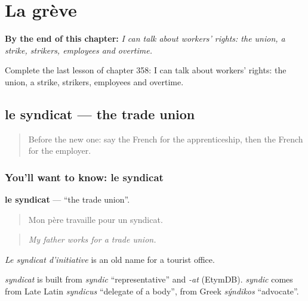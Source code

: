 
\chapter{La grève}
\label{ch:fr-la-greve}

\begin{chapteropening}
\textbf{By the end of this chapter:} \emph{I can talk about workers' rights: the union, a strike, strikers, employees and overtime.}

Complete the last lesson of chapter 358: I can talk about workers' rights: the union, a strike, strikers, employees and overtime.
\end{chapteropening}

\section[le syndicat]{le syndicat — the trade union}

\label{lesson:FR-C358-syndicat}



\begin{quote}
Before the new one: say the French for the apprenticeship, then the French for the employer.
\end{quote}

\subsection*{You'll want to know: le syndicat}
\textbf{le syndicat} — \textquotedblleft{}the trade union\textquotedblright{}.

\begin{quote}
Mon père travaille pour un syndicat.
\end{quote}

\begin{quote}
\emph{My father works for a trade union.}
\end{quote}

\emph{Le syndicat d'initiative} is an old name for a tourist office.

\begin{cousinweb}
\emph{syndicat} is built from \emph{syndic} \textquotedblleft{}representative\textquotedblright{} and \emph{-at} (EtymDB). \emph{syndic} comes from Late Latin \emph{syndicus} \textquotedblleft{}delegate of a body\textquotedblright{}, from Greek \emph{sýndikos} \textquotedblleft{}advocate\textquotedblright{}.
\end{cousinweb}

